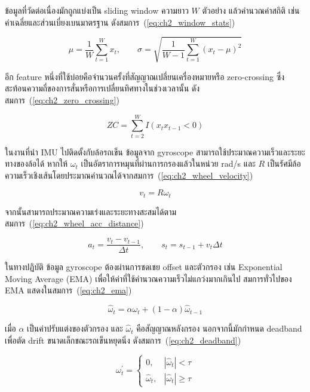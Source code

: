 ข้อมูลที่วัดต่อเนื่องมักถูกแบ่งเป็น sliding window ความยาว $W$ ตัวอย่าง แล้วคำนวณค่าสถิติ เช่น ค่าเฉลี่ยและส่วนเบี่ยงเบนมาตรฐาน ดังสมการ~(\ref{eq:ch2_window_stats})

\begin{equation}
    \mu = \frac{1}{W}\sum_{t=1}^{W}x_t, \qquad
    \sigma = \sqrt{\frac{1}{W-1}\sum_{t=1}^{W}(x_t-\mu)^2}
    \label{eq:ch2_window_stats}
\end{equation}

อีก feature หนึ่งที่ใช้บ่อยคือจำนวนครั้งที่สัญญาณเปลี่ยนเครื่องหมายหรือ zero-crossing ซึ่งสะท้อนความถี่ของการสั่นหรือการเปลี่ยนทิศทางในช่วงเวลานั้น ดังสมการ~(\ref{eq:ch2_zero_crossing})

\begin{equation}
    ZC = \sum_{t=2}^{W} I(x_t x_{t-1} < 0)
    \label{eq:ch2_zero_crossing}
\end{equation}

ในงานที่นำ IMU ไปติดตั้งกับล้อรถเข็น ข้อมูลจาก gyroscope สามารถใช้ประมาณความเร็วและระยะทางของล้อได้ หากให้ $\omega_t$ เป็นอัตราการหมุนที่ผ่านการกรองแล้วในหน่วย rad/s และ $R$ เป็นรัศมีล้อ ความเร็วเชิงเส้นโดยประมาณคำนวณได้จากสมการ~(\ref{eq:ch2_wheel_velocity})

\begin{equation}
    v_t = R\omega_t
    \label{eq:ch2_wheel_velocity}
\end{equation}

จากนั้นสามารถประมาณความเร่งและระยะทางสะสมได้ตามสมการ~(\ref{eq:ch2_wheel_acc_distance})

\begin{equation}
    a_t = \frac{v_t-v_{t-1}}{\Delta t}, \qquad
    s_t = s_{t-1} + v_t \Delta t
    \label{eq:ch2_wheel_acc_distance}
\end{equation}

ในทางปฏิบัติ ข้อมูล gyroscope ต้องผ่านการชดเชย offset และตัวกรอง เช่น Exponential Moving Average (EMA) เพื่อให้ค่าที่ใช้คำนวณความเร็วไม่แกว่งมากเกินไป สมการทั่วไปของ EMA แสดงในสมการ~(\ref{eq:ch2_ema})

\begin{equation}
    \hat{\omega}_{t} = \alpha \omega_t + (1-\alpha)\hat{\omega}_{t-1}
    \label{eq:ch2_ema}
\end{equation}

เมื่อ $\alpha$ เป็นค่าปรับแต่งของตัวกรอง และ $\hat{\omega}_{t}$ คือสัญญาณหลังกรอง นอกจากนี้มักกำหนด deadband เพื่อตัด drift ขนาดเล็กขณะรถเข็นหยุดนิ่ง ดังสมการ~(\ref{eq:ch2_deadband})

\begin{equation}
    \omega^{'}_t =
    \begin{cases}
        0, & |\hat{\omega}_t| < \tau \\
        \hat{\omega}_t, & |\hat{\omega}_t| \geq \tau
    \end{cases}
    \label{eq:ch2_deadband}
\end{equation}

